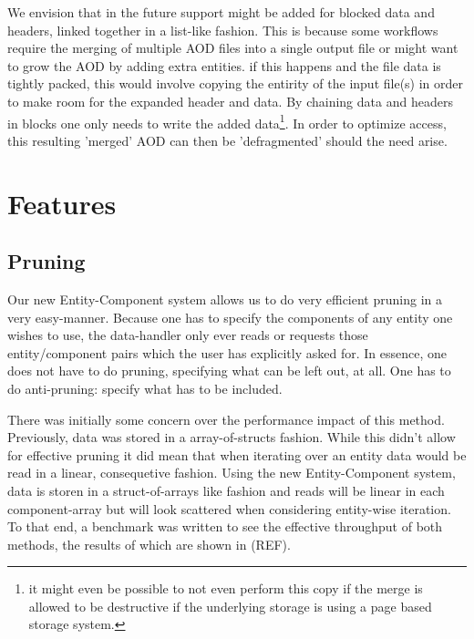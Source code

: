 \documentclass[a4paper]{report}
\begin{document}
\par  We envision that in the future support might be added for blocked data and headers, linked together in
a list-like fashion. This is because some workflows require the merging of multiple AOD files into a single output file or might want to grow the AOD by adding extra entities. if this happens and the
file data is tightly packed, this would involve copying the entirity of the input file(s) in order to make room for the expanded header and data. By chaining data and headers in blocks one only needs to write
the added data\footnote{it might even be possible to not even perform this copy if the merge is allowed to be destructive if the underlying storage is using a page based storage system.}.
 In order to optimize access, this resulting 'merged' AOD can then be 'defragmented' should the need arise.

\section{Features}
\subsection{Pruning}
Our new Entity-Component system allows us to do very efficient pruning in a very easy-manner. Because one has to specify the components of any entity one wishes to use,
the data-handler only ever reads or requests those entity/component pairs which the user has explicitly asked for. In essence, one does not have to do pruning, specifying what
can be left out, at all. One has to do anti-pruning: specify what has to be included.
 \par There was initially some concern over the performance impact of this method. Previously, data was stored in a array-of-structs fashion. While this didn't allow
 for effective pruning it did mean that when iterating over an entity data would be read in a linear, consequetive fashion.
 Using the new Entity-Component system, data is storen in a struct-of-arrays like fashion and reads will be
 linear in each component-array but will look scattered when considering entity-wise iteration.
 To that end, a benchmark was written to see the effective throughput of both methods, the results of which are shown in (REF).
\end{document}
